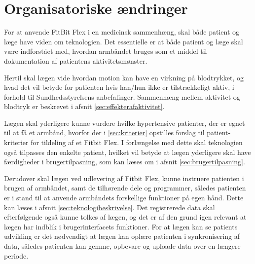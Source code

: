 \section{Organisatoriske ændringer}

For at anvende FitBit Flex i en medicinsk sammenhæng, skal både patient og læge have viden om teknologien. Det essentielle er at både patient og læge skal være indforstået med, hvordan armbåndet bruges som et middel til dokumentation af patientens aktivitetsmønster.

Hertil skal lægen vide hvordan motion kan have en virkning på blodtrykket, og hvad det vil betyde for patienten hvis han/hun ikke er tilstrækkeligt aktiv, i forhold til Sundhedsstyrelsens anbefalinger. Sammenhæng mellem aktivitet og blodtryk er beskrevet i afsnit \ref{sec:effekterafaktivitet}.

Lægen skal yderligere kunne vurdere hvilke hypertensive patienter, der er egnet til at få et armbånd, hvorfor der i \autoref{sec:kriterier} opstilles forslag til patient-kriterier for tildeling af et Fitbit Flex. I forlængelse med dette skal teknologien også tilpasses den enkelte patient, hvilket vil betyde at lægen yderligere skal have færdigheder i brugertilpasning, som kan læses om i afsnit \ref{sec:brugertilpasning}. 

Derudover skal lægen ved udlevering af Fitbit Flex, kunne instruere patienten i brugen af armbåndet, samt de tilhørende dele og programmer, således patienten er i stand til at anvende armbåndets forskellige funktioner på egen hånd. Dette kan læses i afsnit \ref{sec:teknologibeskrivelse}. Det registrerede data skal efterfølgende også kunne tolkes af lægen, og det er af den grund igen relevant at lægen har indblik i brugerinterfacets funktioner. For at lægen kan se patients udvikling er det nødvendigt at lægen kan oplære patienten i synkronisering af data, således patienten kan gemme, opbevare og uploade data over en længere periode.